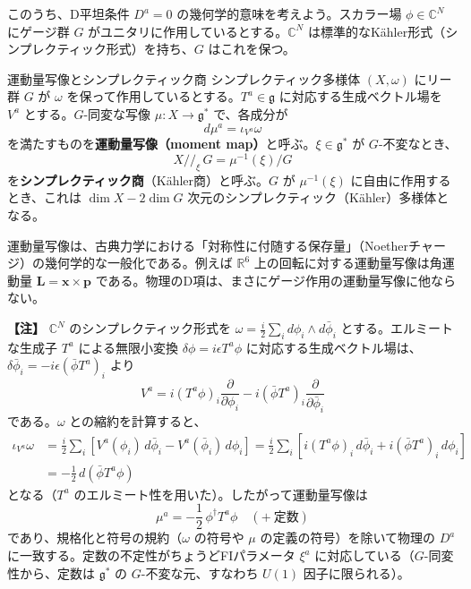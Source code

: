 \documentclass[uplatex, dvipdfmx, book]{jsbook}
\newenvironment{note}{\vspace{1ex}\par\footnotesize\noindent\textbf{【注】}}{\par\vspace{1ex}}
\begin{document}
このうち、D平坦条件 $D^a=0$ の幾何学的意味を考えよう。スカラー場 $\phi \in \mathbb{C}^N$ にゲージ群 $G$ がユニタリに作用しているとする。$\mathbb{C}^N$ は標準的なK\"ahler形式（シンプレクティック形式）を持ち、$G$ はこれを保つ。

\begin{mydef}{運動量写像とシンプレクティック商}{}
シンプレクティック多様体 $(X, \omega)$ にリー群 $G$ が $\omega$ を保って作用しているとする。$T^a \in \mathfrak{g}$ に対応する生成ベクトル場を $V^a$ とする。$G$-同変な写像 $\mu: X \to \mathfrak{g}^*$ で、各成分が
\begin{equation*}
    d\mu^a = \iota_{V^a}\omega
\end{equation*}
を満たすものを\textbf{運動量写像（moment map）}と呼ぶ。$\xi \in \mathfrak{g}^*$ が $G$-不変なとき、
\begin{equation*}
    X /\!/_{\xi}\, G = \mu^{-1}(\xi) / G
\end{equation*}
を\textbf{シンプレクティック商}（K\"ahler商）と呼ぶ。$G$ が $\mu^{-1}(\xi)$ に自由に作用するとき、これは $\dim X - 2\dim G$ 次元のシンプレクティック（K\"ahler）多様体となる。
\end{mydef}

運動量写像は、古典力学における「対称性に付随する保存量」（Noetherチャージ）の幾何学的な一般化である。例えば $\mathbb{R}^6$ 上の回転に対する運動量写像は角運動量 $\bm{L} = \bm{x} \times \bm{p}$ である。物理のD項は、まさにゲージ作用の運動量写像に他ならない。

\begin{note}
$\mathbb{C}^N$ のシンプレクティック形式を $\omega = \frac{i}{2} \sum_i d\phi_i \wedge d\bar{\phi}_i$ とする。エルミートな生成子 $T^a$ による無限小変換 $\delta\phi = i\epsilon T^a\phi$ に対応する生成ベクトル場は、$\delta\bar\phi_i = -i\epsilon(\bar\phi T^a)_i$ より
\begin{equation*}
    V^a = i(T^a \phi)_i \frac{\partial}{\partial \phi_i} - i(\bar{\phi} T^a)_i \frac{\partial}{\partial \bar{\phi}_i}
\end{equation*}
である。$\omega$ との縮約を計算すると、
\begin{align*}
    \iota_{V^a}\omega &= \frac{i}{2}\sum_i \left[ V^a(\phi_i)\, d\bar\phi_i - V^a(\bar\phi_i)\, d\phi_i \right]
    = \frac{i}{2}\sum_i \left[ i(T^a\phi)_i\, d\bar\phi_i + i(\bar\phi T^a)_i\, d\phi_i \right] \\
    &= -\frac{1}{2}\, d\left( \bar\phi T^a \phi \right)
\end{align*}
となる（$T^a$ のエルミート性を用いた）。したがって運動量写像は
\begin{equation*}
    \mu^a = -\frac{1}{2}\,\phi^\dagger T^a \phi \quad (+\ \text{定数})
\end{equation*}
であり、規格化と符号の規約（$\omega$ の符号や $\mu$ の定義の符号）を除いて物理の $D^a$ に一致する。定数の不定性がちょうどFIパラメータ $\xi^a$ に対応している（$G$-同変性から、定数は $\mathfrak{g}^*$ の $G$-不変な元、すなわち $U(1)$ 因子に限られる）。
\end{note}
\end{document}
